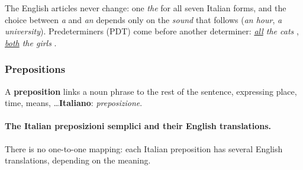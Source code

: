 The English articles never change: one \emph{the} for all seven Italian forms, and the
choice between \emph{a} and \emph{an} depends only on the \emph{sound} that follows
(\emph{an hour}, \emph{a university}). Predeterminers (PDT) come before another
determiner: \emph{\underline{all} the cats} , \emph{\underline{both}
the girls} .

\subsubsection{Prepositions}
\notinslides

A \textbf{preposition} links a noun phrase to the rest of the sentence, expressing place,
time, means, \ldots \quad \textbf{Italiano}: \emph{preposizione}.

\paragraph{The Italian preposizioni semplici and their English translations.} There is
no one-to-one mapping: each Italian preposition has several English translations,
depending on the meaning.

